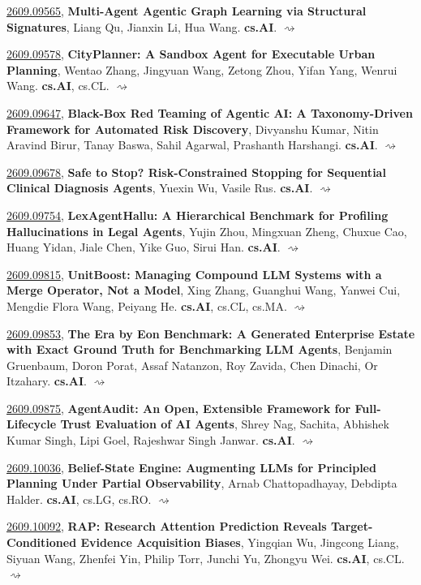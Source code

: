 \documentclass[9pt, a4paper]{article}
\theoremstyle{plain}
\theoremstyle{definition}
\theoremstyle{remark}
\newcommand{\arxiv}[3]{\href{https://arxiv.org/abs/#1}{#1}, \textbf{\textcolor{arxivblue}{#2}}, #3. }
\begin{document}
\arxiv{2609.09565}{Multi-Agent Agentic Graph Learning via Structural Signatures}{Liang Qu, Jianxin Li, Hua Wang}\textbf{cs.AI}. \hyperlink{2609.09565}{$\rightsquigarrow$}

\arxiv{2609.09578}{CityPlanner: A Sandbox Agent for Executable Urban Planning}{Wentao Zhang, Jingyuan Wang, Zetong Zhou, Yifan Yang, Wenrui Wang}\textbf{cs.AI}, cs.CL. \hyperlink{2609.09578}{$\rightsquigarrow$}

\arxiv{2609.09647}{Black-Box Red Teaming of Agentic AI: A Taxonomy-Driven Framework for Automated Risk Discovery}{Divyanshu Kumar, Nitin Aravind Birur, Tanay Baswa, Sahil Agarwal, Prashanth Harshangi}\textbf{cs.AI}. \hyperlink{2609.09647}{$\rightsquigarrow$}

\arxiv{2609.09678}{Safe to Stop? Risk-Constrained Stopping for Sequential Clinical Diagnosis Agents}{Yuexin Wu, Vasile Rus}\textbf{cs.AI}. \hyperlink{2609.09678}{$\rightsquigarrow$}

\arxiv{2609.09754}{LexAgentHallu: A Hierarchical Benchmark for Profiling Hallucinations in Legal Agents}{Yujin Zhou, Mingxuan Zheng, Chuxue Cao, Huang Yidan, Jiale Chen, Yike Guo, Sirui Han}\textbf{cs.AI}. \hyperlink{2609.09754}{$\rightsquigarrow$}

\arxiv{2609.09815}{UnitBoost: Managing Compound LLM Systems with a Merge Operator, Not a Model}{Xing Zhang, Guanghui Wang, Yanwei Cui, Mengdie Flora Wang, Peiyang He}\textbf{cs.AI}, cs.CL, cs.MA. \hyperlink{2609.09815}{$\rightsquigarrow$}

\arxiv{2609.09853}{The Era by Eon Benchmark: A Generated Enterprise Estate with Exact Ground Truth for Benchmarking LLM Agents}{Benjamin Gruenbaum, Doron Porat, Assaf Natanzon, Roy Zavida, Chen Dinachi, Or Itzahary}\textbf{cs.AI}. \hyperlink{2609.09853}{$\rightsquigarrow$}

\arxiv{2609.09875}{AgentAudit: An Open, Extensible Framework for Full-Lifecycle Trust Evaluation of AI Agents}{Shrey Nag, Sachita, Abhishek Kumar Singh, Lipi Goel, Rajeshwar Singh Janwar}\textbf{cs.AI}. \hyperlink{2609.09875}{$\rightsquigarrow$}

\arxiv{2609.10036}{Belief-State Engine: Augmenting LLMs for Principled Planning Under Partial Observability}{Arnab Chattopadhayay, Debdipta Halder}\textbf{cs.AI}, cs.LG, cs.RO. \hyperlink{2609.10036}{$\rightsquigarrow$}

\arxiv{2609.10092}{RAP: Research Attention Prediction Reveals Target-Conditioned Evidence Acquisition Biases}{Yingqian Wu, Jingcong Liang, Siyuan Wang, Zhenfei Yin, Philip Torr, Junchi Yu, Zhongyu Wei}\textbf{cs.AI}, cs.CL. \hyperlink{2609.10092}{$\rightsquigarrow$}
\end{document}
